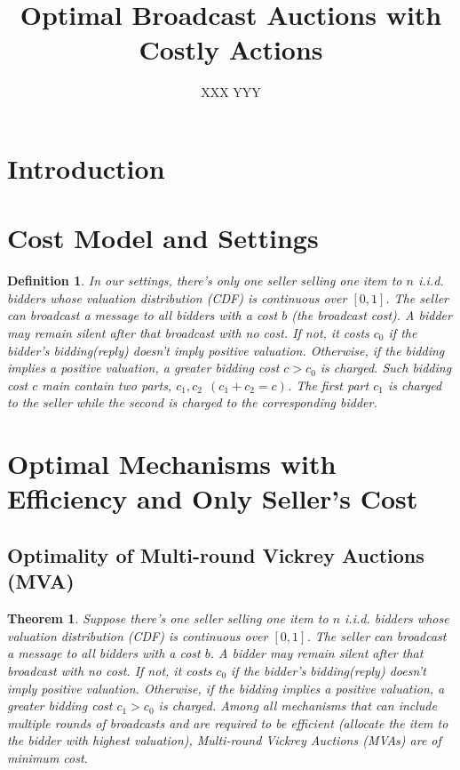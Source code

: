 \documentclass{aamas2012}
\begin{document}
\title{Optimal Broadcast Auctions with Costly Actions}


\author{
\alignauthor
XXX
\alignauthor
YYY
}


\maketitle

\section{Introduction}

\section{Cost Model and Settings}
\newtheorem{definition}{Definition}
\begin{definition}
In our settings, there's only one seller selling one item to $n$ i.i.d. bidders
whose valuation distribution (CDF) is continuous over $[0, 1]$.
The seller can broadcast a message to all bidders with a 
cost $b$ (the broadcast cost). A bidder may remain silent after that broadcast with no cost.
If not, it costs $c_0$ if the bidder's bidding(reply) doesn't
imply positive valuation. Otherwise, if the bidding implies a positive 
valuation, a greater bidding cost $c > c_0$ is charged.
Such bidding cost $c$ main contain two parts, $c_1, c_2~~(c_1+c_2 = c)$. 
The first part $c_1$ is charged to the seller while the second is charged to
the corresponding bidder.
\end{definition}

\section{Optimal Mechanisms with Efficiency and Only Seller's Cost}

\subsection{Optimality of Multi-round Vickrey Auctions (MVA)}

\newtheorem{theorem}{Theorem}
\begin{theorem}\label{theorem1}
Suppose there's one seller selling one item to $n$ i.i.d. bidders
whose valuation distribution (CDF) is continuous over $[0, 1]$.
The seller can broadcast a message to all bidders with a 
cost $b$. A bidder may remain silent after that broadcast with no cost.
If not, it costs $c_0$ if the bidder's bidding(reply) doesn't
imply positive valuation. Otherwise, if the bidding implies a positive 
valuation, a greater bidding cost $c_1 > c_0$ is charged.
Among all mechanisms that can include multiple rounds of broadcasts
and are required to be efficient (allocate the item to the bidder with
highest valuation), Multi-round Vickrey Auctions (MVAs) are of minimum
cost.
\end{theorem}
\end{document}
